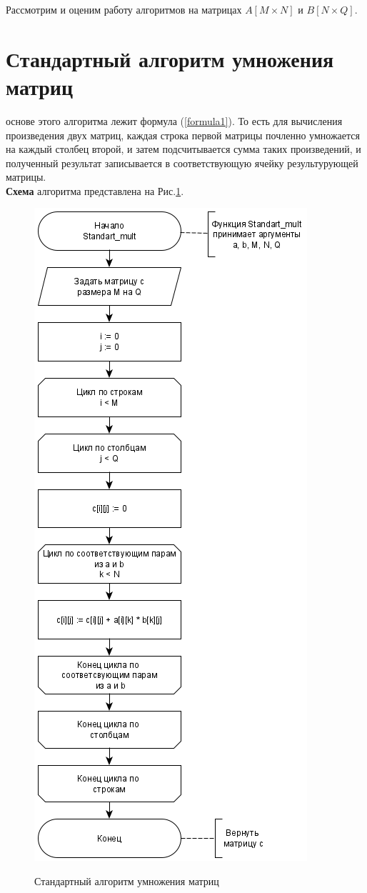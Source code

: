 Рассмотрим и оценим работу алгоритмов на матрицах $A[M \times N]$ и $B[N \times Q]$. 

\section{Стандартный алгоритм умножения матриц}
 основе этого алгоритма лежит формула (\ref{formula1}). То есть для вычисления произведения двух матриц, каждая строка первой матрицы почленно умножается на каждый столбец второй, и затем подсчитывается сумма таких произведений, и полученный результат записывается в соответствующую ячейку результурующей матрицы.\\

\textbf{Схема} алгоритма представлена на Рис.\ref{fig1:image}.
\begin{figure}[h]
	\begin{center}
		{\includegraphics[scale = 0.46]{schemes/standart}}
		\caption{Стандартный алгоритм умножения матриц}
		\label{fig1:image}
	\end{center}
\end{figure}

